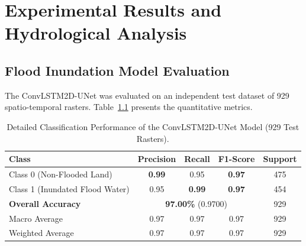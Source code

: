 \documentclass[12pt,a4paper,oneside]{report}
\begin{document}
\chapter{Experimental Results and Hydrological Analysis}
\label{chap:results}

\section{Flood Inundation Model Evaluation}
The ConvLSTM2D-UNet was evaluated on an independent test dataset of 929 spatio-temporal rasters. Table~\ref{tab:flood_results} presents the quantitative metrics.

\begin{table}[H]
\centering
\caption{Detailed Classification Performance of the ConvLSTM2D-UNet Model (929 Test Rasters).}
\label{tab:flood_results}
\begin{tabular}{lcccc}
\toprule
\textbf{Class} & \textbf{Precision} & \textbf{Recall} & \textbf{F1-Score} & \textbf{Support} \\
\midrule
Class 0 (Non-Flooded Land) & \textbf{0.99} & 0.95 & \textbf{0.97} & 475 \\
Class 1 (Inundated Flood Water) & 0.95 & \textbf{0.99} & \textbf{0.97} & 454 \\
\midrule
\textbf{Overall Accuracy} & \multicolumn{3}{c}{\textbf{97.00\%} (0.9700)} & 929 \\
Macro Average & 0.97 & 0.97 & 0.97 & 929 \\
Weighted Average & 0.97 & 0.97 & 0.97 & 929 \\
\bottomrule
\end{tabular}
\end{table}
\end{document}
